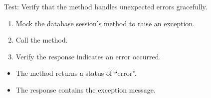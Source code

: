 \documentclass[letterpaper,10pt,english]{sphinxmanual}
\begin{document}
\begin{fulllineitems}
\label{\detokenize{test:test.test_admin.test_list_admins_unexpected_error}}
\pysigstartsignatures
\pysiglinewithargsret
{}
{\sphinxparamcomma {}}
{}
\pysigstopsignatures
\sphinxAtStartPar
Test: Verify that the method handles unexpected errors gracefully.
\begin{description}
\begin{enumerate}
%
\item {} 
\sphinxAtStartPar
Mock the database session’s  method to raise an exception.

\item {} 
\sphinxAtStartPar
Call the  method.

\item {} 
\sphinxAtStartPar
Verify the response indicates an error occurred.

\end{enumerate}

\begin{itemize}
\item {} 
\sphinxAtStartPar
The method returns a status of “error”.

\item {} 
\sphinxAtStartPar
The response contains the exception message.

\end{itemize}

\end{description}

\end{fulllineitems}

\end{document}
